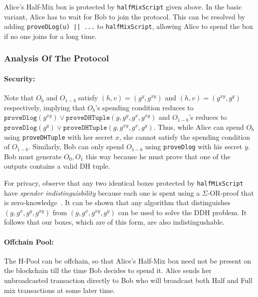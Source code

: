 \documentclass[11pt]{article}
\begin{document}
Alice's Half-Mix box is protected by \texttt{halfMixScript} given above. In the basic variant, Alice has to wait for Bob to join the protocol. This can be resolved by adding  \texttt{proveDLog(u) || ...} to \texttt{halfMixScript}, allowing Alice to spend the box if no one joins for a long time.  

\subsubsection{Analysis Of The Protocol}
\paragraph{Security:} Note that $O_b$ and $O_{1-b}$ satisfy $(h, v) = (g^y, g^{xy})$ and $(h, v) = (g^{xy}, g^y)$ respectively, implying that $O_b$'s  spending condition reduces to $\texttt{proveDlog}(g^{xy}) \lor \texttt{proveDHTuple}(g, g^y, g^x, g^{xy})$ and $O_{1-b}$'s reduces to $\texttt{proveDlog}(g^y) \lor \texttt{proveDHTuple}(g, g^{xy}, g^x, g^y)$. Thus, while Alice can spend $O_b$ using \texttt{proveDHTuple} with her secret $x$, she cannot satisfy the spending condition of $O_{1-b}$. Similarly, Bob can only spend $O_{1-b}$ using \texttt{proveDlog} with his secret $y$. Bob must generate $O_0, O_1$ this way because he must prove that one of the outputs contains a valid DH tuple.

For privacy, observe that any two identical boxes protected by \texttt{halfMixScript} have {\em spender indistinguisbility} because each one is spent using a $\Sigma$-OR-proof that is zero-knowledge~\cite{Dam10}. It can be shown that any algorithm that distinguishes $(g, g^x, g^y, g^{xy})$ from $(g, g^x, g^{xy}, g^y)$ can be used to solve the DDH problem. It follows that our boxes, which are of this form, are also indistingushable.

\paragraph{Offchain Pool:} The H-Pool can be offchain, so that Alice's Half-Mix box need not be present on the blockchain till the time Bob decides to spend it. Alice sends her unbroadcasted transaction directly to Bob who will broadcast both Half and Full mix transactions at some later time. 

\end{document}
